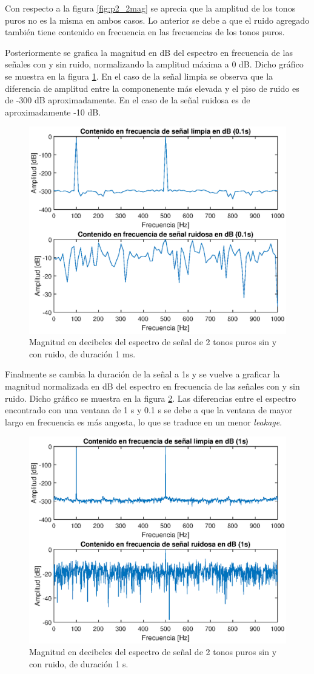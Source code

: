 Con respecto a la figura \ref{fig:p2_2mag} se aprecia que la amplitud de los tonos puros no es la misma en ambos casos. Lo anterior se debe a que el ruido agregado también tiene contenido en frecuencia en las frecuencias de los tonos puros.

Posteriormente se grafica la magnitud en dB del espectro en frecuencia de las señales con y sin ruido, normalizando la amplitud máxima a 0 dB. Dicho gráfico se muestra en la figura \ref{fig:p2_3mag}. En el caso de la señal limpia se observa que la diferencia de amplitud entre la componenente más elevada y el piso de ruido es de -300 dB aproximadamente. En el caso de la señal ruidosa es de aproximadamente -10 dB. 

\begin{figure}[H]
    \centering
    \includegraphics[width = .8\linewidth]{Figuras/3.eps}
    \caption{Magnitud en decibeles del espectro de señal de 2 tonos puros sin y con ruido, de duración 1 ms.}
    \label{fig:p2_3mag}
\end{figure}


Finalmente se cambia la duración de la señal a 1s y se vuelve a graficar la magnitud normalizada en dB del espectro en frecuencia de las señales con y sin ruido. Dicho gráfico se muestra en la figura \ref{fig:p2_4mag}. Las diferencias entre el espectro encontrado con una ventana de 1 s y 0.1 s se debe a que la ventana de mayor largo en frecuencia es más angosta, lo que se traduce en un menor \textit{leakage}.

\begin{figure}[H]
    \centering
    \includegraphics[width = .8\linewidth]{Figuras/4.eps}
    \caption{Magnitud en decibeles del espectro de señal de 2 tonos puros sin y con ruido, de duración 1 s.}
    \label{fig:p2_4mag}
\end{figure}